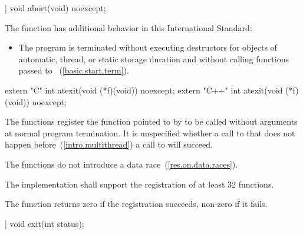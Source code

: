 %
\begin{itemdecl}
[[noreturn]] void abort(void) noexcept;
\end{itemdecl}

\begin{itemdescr}
\pnum
The function
has additional behavior in this International Standard:

\begin{itemize}
\item
The program is terminated without executing destructors for objects of
automatic, thread, or static storage
duration and without calling functions passed to
~(\ref{basic.start.term}).
%
%
\end{itemize}
\end{itemdescr}

\begin{itemdecl}
extern "C" int atexit(void (*f)(void)) noexcept;
extern "C++" int atexit(void (*f)(void)) noexcept;
\end{itemdecl}

\begin{itemdescr}
\pnum
\effects
The
functions register the function pointed to by 
to be called without arguments at normal program termination.
It is unspecified whether a call to  that does not
happen before~(\ref{intro.multithread}) a call to  will succeed.
\begin{note} The  functions do not introduce a data
race~(\ref{res.on.data.races}). \end{note}

\pnum
\implimits
The implementation shall support the registration of at least 32 functions.

\pnum
\returns
The
function returns zero if the registration succeeds,
non-zero if it fails.
\end{itemdescr}

%
\begin{itemdecl}
[[noreturn]] void exit(int status);
\end{itemdecl}

